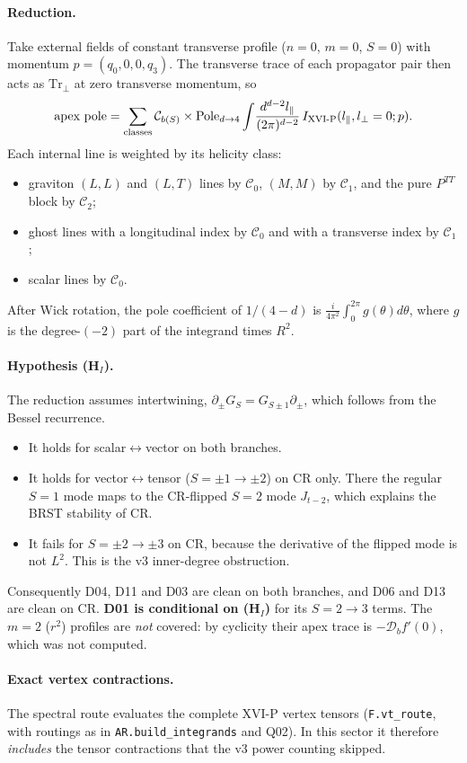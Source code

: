 \documentclass[11pt]{article}
\theoremstyle{definition}
\newcommand{\Ccb}{\mathcal C}
\begin{document}
\paragraph{Reduction.} Take external fields of constant transverse profile ($n=0$, $m=0$, $S=0$) with momentum $p=(q_0,0,0,q_3)$. The transverse trace of each propagator pair then acts as $\mathrm{Tr}_\perp$ at zero transverse momentum, so
\[ \text{apex pole}=\sum_{\text{classes}}\Ccb_{b(S)}\times\mathrm{Pole}_{d\to4}\int\!\frac{d^{d-2}l_\parallel}{(2\pi)^{d-2}}\,I_{\rm XVI\text{-}P}(l_\parallel,l_\perp=0;p). \]
Each internal line is weighted by its helicity class:
\begin{itemize}
\item graviton $(L,L)$ and $(L,T)$ lines by $\Ccb_0$, $(M,M)$ by $\Ccb_1$, and the pure $P^{TT}$ block by $\Ccb_2$;
\item ghost lines with a longitudinal index by $\Ccb_0$ and with a transverse index by $\Ccb_1$;
\item scalar lines by $\Ccb_0$.
\end{itemize}
After Wick rotation, the pole coefficient of $1/(4-d)$ is $\frac{i}{4\pi^2}\int_0^{2\pi}g(\theta)d\theta$, where $g$ is the degree-$(-2)$ part of the integrand times $R^2$.

\paragraph{Hypothesis (H$_I$).} The reduction assumes intertwining, $\partial_\pm G_S=G_{S\pm1}\partial_\pm$, which follows from the Bessel recurrence.
\begin{itemize}
\item It holds for scalar$\leftrightarrow$vector on both branches.
\item It holds for vector$\leftrightarrow$tensor ($S=\pm1\to\pm2$) on CR only. There the regular $S=1$ mode maps to the CR-flipped $S=2$ mode $J_{t-2}$, which explains the BRST stability of CR.
\item It fails for $S=\pm2\to\pm3$ on CR, because the derivative of the flipped mode is not $L^2$. This is the v3 inner-degree obstruction.
\end{itemize}
Consequently D04, D11 and D03 are clean on both branches, and D06 and D13 are clean on CR. \textbf{D01 is conditional on (H$_I$)} for its $S=2\to3$ terms. The $m=2$ ($r^2$) profiles are \emph{not} covered: by cyclicity their apex trace is $-\mathcal D_b f'(0)$, which was not computed.

\paragraph{Exact vertex contractions.} The spectral route evaluates the complete XVI-P vertex tensors (\texttt{F.vt\_route}, with routings as in \texttt{AR.build\_integrands} and Q02). In this sector it therefore \emph{includes} the tensor contractions that the v3 power counting skipped.
\end{document}
